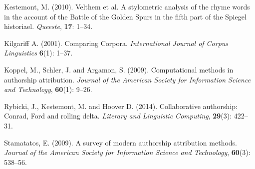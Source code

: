 \documentclass[11pt,a4paper]{article}
\begin{document}
Kestemont, M. (2010). Velthem et al. A stylometric analysis of the
rhyme words in the account of the Battle of the Golden Spurs in the
fifth part of the Spiegel historiael. \textit{Queeste}, \textbf{17}:
1--34.

Kilgariff A. (2001). Comparing Corpora. \textit{International Journal
of Corpus Linguistics} \textbf{6}(1): 1--37.

Koppel, M., Schler, J. and Argamon, S. (2009). Computational methods
in authorship attribution. \textit{Journal of the American Society
for Information Science and Technology}, \textbf{60}(1): 9--26.

Rybicki, J., Kestemont, M. and Hoover D. (2014). Collaborative authorship:
Conrad, Ford and rolling delta. \textit{Literary and Linguistic Computing},
\textbf{29}(3): 422--31.

Stamatatos, E. (2009). A survey of modern authorship attribution methods.
\textit{Journal of the American Society for Information Science and
Technology}, \textbf{60}(3): 538--56.
\end{document}
